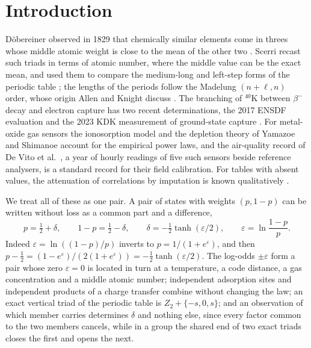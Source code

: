 \documentclass[11pt]{article}
\theoremstyle{definition}\newtheorem{definition}[theorem]{Definition}
\theoremstyle{remark}\newtheorem{remark}[theorem]{Remark}
\begin{document}
\section{Introduction}\label{sec:intro}
D\"obereiner observed in 1829 that chemically similar elements come in threes whose middle atomic weight is close to the mean of the other two \cite{Dob1829}. Scerri recast such triads in terms of atomic number, where the middle value can be the exact mean, and used them to compare the medium-long and left-step forms of the periodic table \cite{Scerri2008,Scerri2010,Scerri2022}; the lengths of the periods follow the Madelung $(n+\ell,n)$ order, whose origin Allen and Knight discuss \cite{AllenKnight}. The branching of ${}^{40}$K between $\beta^-$ decay and electron capture has two recent determinations, the 2017 ENSDF evaluation \cite{Chen} and the 2023 KDK measurement of ground-state capture \cite{KDK,Kossert}. For metal-oxide gas sensors the ionosorption model \cite{BarsanWeimar2001,MadouMorrison} and the depletion theory of Yamazoe and Shimanoe \cite{YamazoeShimanoe} account for the empirical power laws, and the air-quality record of De Vito et al.\ \cite{DeVito,UCI}, a year of hourly readings of five such sensors beside reference analysers, is a standard record for their field calibration. For tables with absent values, the attenuation of correlations by imputation is known qualitatively \cite{LittleRubin,SchaferGraham}.

We treat all of these as one pair. A pair of states with weights $(p,1-p)$ can be written without loss as a common part and a difference,
\begin{equation}\label{eq:pair}
p=\tfrac12+\delta,\qquad1-p=\tfrac12-\delta,\qquad\delta=-\tfrac12\tanh(\varepsilon/2),\qquad\varepsilon=\ln\frac{1-p}p .
\end{equation}
Indeed $\varepsilon=\ln((1-p)/p)$ inverts to $p=1/(1+e^{\varepsilon})$, and then $p-\frac12=(1-e^{\varepsilon})/(2(1+e^{\varepsilon}))=-\frac12\tanh(\varepsilon/2)$. The log-odds $\pm\varepsilon$ form a pair whose zero $\varepsilon=0$ is located in turn at a temperature, a code distance, a gas concentration and a middle atomic number; independent adsorption sites and independent products of a charge transfer combine without changing the law; an exact vertical triad of the periodic table is $Z_2+\{-s,0,s\}$; and an observation of which member carries determines $\delta$ and nothing else, since every factor common to the two members cancels, while in a group the shared end of two exact triads closes the first and opens the next.
\end{document}
